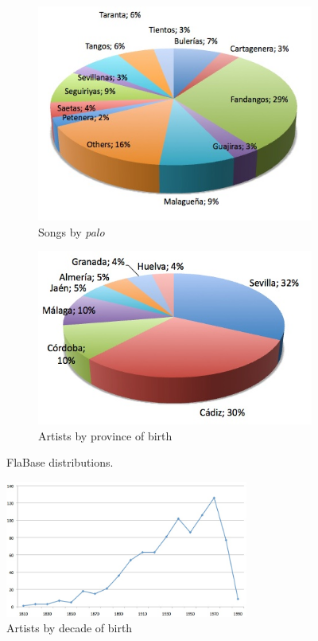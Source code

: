\begin{figure}[ht!]
    \centering
    \begin{subfigure}{.45\textwidth}
        \centering
        \includegraphics[width=.9\linewidth]{ch05_musicology_pics/Songs-by-palo.jpg}
    	\caption{Songs by \textit{palo}}
        \label{fig:musicology:graph-palo}
    \end{subfigure}
    \begin{subfigure}{.52\textwidth}
        \centering
        \includegraphics[width=.9\linewidth]{ch05_musicology_pics/Artists-by-province.jpg}
		\caption{Artists by province of birth}
		\label{fig:musicology:graph-province}
    \end{subfigure}
    \caption{FlaBase distributions.}
\end{figure}


\begin{figure}[!ht]
	\centering
	\includegraphics[width=8cm]{ch05_musicology_pics/Artists-by-decade-of-birth.jpg}
	\caption{Artists by decade of birth 
	\label{fig:musicology:graph-decade}}
\end{figure}


